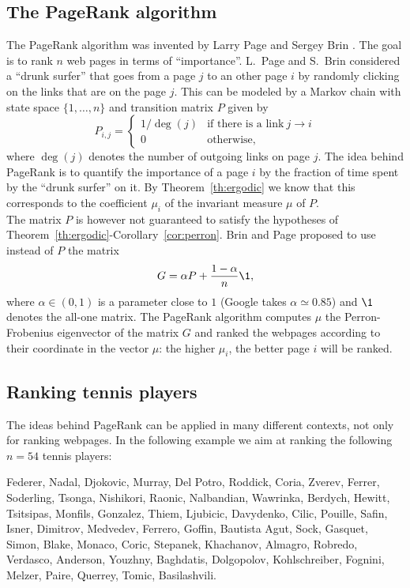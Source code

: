 \documentclass[11pt,nocut]{article}
\begin{document}
\subsection{The PageRank algorithm}

The PageRank algorithm was invented by Larry Page and Sergey Brin \cite{page1999pagerank}.
The goal is to rank $n$ web pages in terms of ``importance''.
L.\ Page and S.\ Brin  considered a ``drunk surfer'' that goes from a page $j$ to an other page $i$ by randomly clicking on the links that are on the page $j$.
This can be modeled by a Markov chain with state space $\{1, \dots, n\}$ and transition matrix $P$ given by
$$
P_{i,j} 
= 
\begin{cases}
	1 / \deg(j) & \text{if there is a link} \ j \to i \\
	0 & \text{otherwise},
\end{cases}
$$
where $\deg(j)$ denotes the number of outgoing links on page $j$.
The idea behind PageRank is to quantify the importance of a page $i$ by the fraction of time spent by the ``drunk surfer'' on it. By Theorem~\ref{th:ergodic} we know that this corresponds to the coefficient $\mu_i$ of the invariant measure $\mu$ of $P$.
\\

The matrix $P$ is however not guaranteed to satisfy the hypotheses of Theorem~\ref{th:ergodic}-Corollary~\ref{cor:perron}. Brin and Page proposed to use instead of $P$ the matrix
$$
G = \alpha P + \frac{1-\alpha}{n} \1,
$$
where $\alpha \in (0,1)$ is a parameter close to $1$ (Google takes $\alpha \simeq 0.85$) and $\1$ denotes the all-one matrix.
The PageRank algorithm computes $\mu$ the Perron-Frobenius eigenvector of the matrix $G$ and ranked the webpages according to their coordinate in the vector $\mu$: the higher $\mu_i$, the better page $i$ will be ranked.

\subsection{Ranking tennis players}

The ideas behind PageRank can be applied in many different contexts, not only for ranking webpages.
In the following example we aim at ranking the following $n=54$ tennis players:
\begin{center}
Federer, Nadal, Djokovic, Murray, Del Potro, Roddick, Coria, Zverev, Ferrer, Soderling, Tsonga, Nishikori, Raonic, Nalbandian, Wawrinka, Berdych, Hewitt, Tsitsipas, Monfils, Gonzalez, Thiem, Ljubicic, Davydenko, Cilic, Pouille, Safin, Isner, Dimitrov, Medvedev, Ferrero, Goffin, Bautista Agut, Sock, Gasquet, Simon, Blake, Monaco, Coric, Stepanek, Khachanov, Almagro, Robredo, Verdasco, Anderson, Youzhny, Baghdatis, Dolgopolov, Kohlschreiber, Fognini, Melzer, Paire, Querrey, Tomic, Basilashvili.
\end{center}
\end{document}
